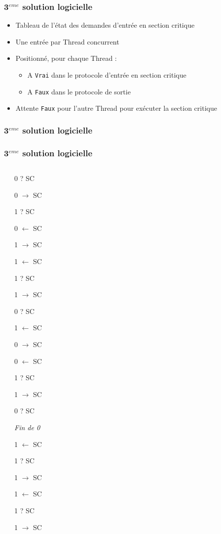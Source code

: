 \begin{frame}
\frametitle{3$^{eme}$ solution logicielle}
\begin{itemize}
\item Tableau de l’état des demandes d’entrée en section critique
\item Une entrée par Thread concurrent
\item Positionné, pour chaque Thread :
\begin{itemize}
\item A \texttt{Vrai} dans le protocole d’entrée en section critique
\item A \texttt{Faux} dans le protocole de sortie
\end{itemize}
\item Attente \texttt{Faux} pour l’autre Thread pour exécuter la section critique
\end{itemize}
\end{frame}

\begin{frame}
\frametitle{3$^{eme}$ solution logicielle}
\begin{scriptsize}\end{scriptsize}
\end{frame}

\begin{frame}
\frametitle{3$^{eme}$ solution logicielle}
\begin{columns}
\begin{scriptsize}\end{scriptsize}
\begin{itemize}
\begin{tiny}
\item 0 ? SC
\item 0 $\rightarrow$ SC
\item 1 ? SC
\item 0 $\leftarrow$ SC
\item 1 $\rightarrow$ SC
\item 1 $\leftarrow$ SC
\item 1 ? SC
\item 1 $\rightarrow$ SC
\item 0 ? SC
\item 1 $\leftarrow$ SC
\item 0 $\rightarrow$ SC
\item 0 $\leftarrow$ SC
\item 1 ? SC
\item 1 $\rightarrow$ SC
\item 0 ? SC
\item \textit{Fin de 0}
\item 1 $\leftarrow$ SC
\item 1 ? SC
\item 1 $\rightarrow$ SC
\item 1 $\leftarrow$ SC
\item 1 ? SC
\item 1 $\rightarrow$ SC
\end{tiny}
\end{itemize}
\end{columns}
\end{frame}


